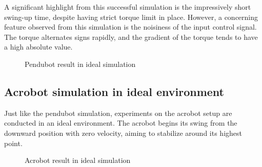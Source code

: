 A significant highlight from this successful simulation is the impressively short swing-up time, despite having strict torque limit in place. However, a concerning feature observed from this simulation is the noisiness of the input control signal. The torque alternates signs rapidly, and the gradient of the torque tends to have a high absolute value.

\begin{figure}[H]
    \centering
    \caption{Pendubot result in ideal simulation }
    \label{fig:ideal_simulation_pendubot}
\end{figure}

\subsection{Acrobot simulation in ideal environment}

Just like the pendubot simulation, experiments on the acrobot setup are conducted in an ideal environment. The acrobot begins its swing from the downward position with zero velocity, aiming to stabilize around its highest point.

\begin{figure}[H]
    \centering
    \caption{Acrobot result in ideal simulation}
    \label{fig:ideal_simulation_acrobot}
\end{figure}


